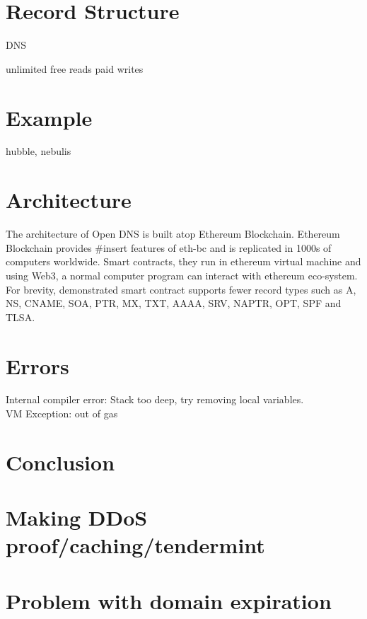 \documentclass[conference]{IEEEtran}
\begin{document}
\section{Record Structure}
DNS 

unlimited free reads
paid writes

\section{Example}
hubble, nebulis

\section{Architecture}
The architecture of Open DNS is built atop Ethereum Blockchain. Ethereum Blockchain provides \#insert features of eth-bc and is replicated in 1000s of computers worldwide. Smart contracts, they run in ethereum virtual machine and using Web3, a normal computer program can interact with ethereum eco-system. For brevity, demonstrated smart contract supports fewer record types such as A, NS, CNAME, SOA, PTR, MX, TXT, AAAA, SRV, NAPTR, OPT, SPF and TLSA.

\section{Errors}
\noindent Internal compiler error: Stack too deep, try removing local variables. \\
VM Exception: out of gas

\section{Conclusion}
\section{Making DDoS proof/caching/tendermint}
\section{Problem with domain expiration}

\end{document}
